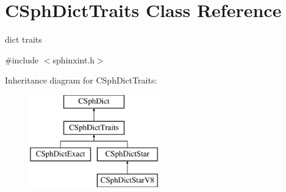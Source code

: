 \hypertarget{classCSphDictTraits}{\section{C\-Sph\-Dict\-Traits Class Reference}
\label{classCSphDictTraits}
}


dict traits  




{\ttfamily \#include $<$sphinxint.\-h$>$}

Inheritance diagram for C\-Sph\-Dict\-Traits\-:\begin{figure}[H]
\begin{center}
\leavevmode
\includegraphics[height=4.000000cm]{classCSphDictTraits}
\end{center}
\end{figure}
